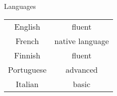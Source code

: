 \begin{rubric}{Languages}
  \begin{tabular}{cc}
      English & fluent \\
      French &  native language \\
      Finnish &  fluent \\
      Portuguese & advanced \\
      Italian & basic
  \end{tabular}
\end{rubric}
